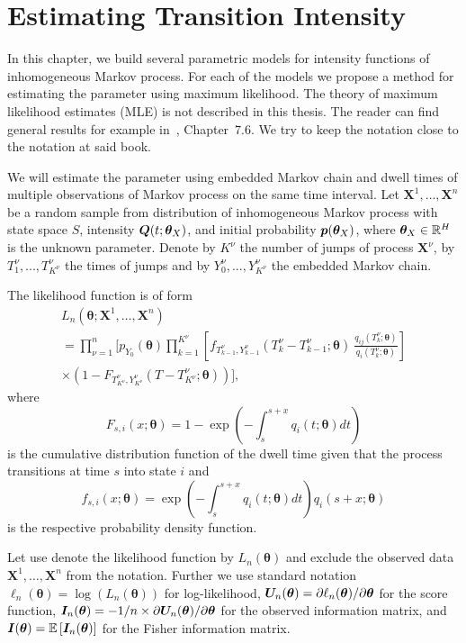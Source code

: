 \chapter{Estimating Transition Intensity}
	\label{chap:statistics}

In this chapter, we build several parametric models for intensity functions of inhomogeneous Markov process. For each of the models we propose a method for estimating the parameter using maximum likelihood. The theory of maximum likelihood estimates (MLE) is not described in this thesis. The reader can find general results for example in~\cite{Andel11}, Chapter~7.6. We try to keep the notation close to the notation at said book.

We will estimate the parameter using embedded Markov chain and dwell times of multiple observations of Markov process on the same time interval. Let $\mathbf{X}^1, \dots, \mathbf{X}^n$ be a random sample from distribution of inhomogeneous Markov process with state space $S$, intensity $\bm{Q} (t; \bm{\theta}_X)$, and initial probability $\bm{p} (\bm{\theta}_X)$, where $\bm{\theta}_X \in \mathbb{R}^H$ is the unknown parameter. Denote by $K^{\nu}$ the number of jumps of process $\mathbf{X}^{\nu}$, by $T^{\nu}_1, ... , T^{\nu}_{K^{\nu}}$ the times of jumps and by $Y^{\nu}_0, ... , Y^{\nu}_{K^{\nu}}$ the embedded Markov chain.

The likelihood function is of form
\begin{multline}
	L_n (\bm{\theta}; \mathbf{X}^1, \dots, \mathbf{X}^n) \\
	=
	\prod_{\nu=1}^n \Biggl[ p_{Y_0} (\mathbf{ \bm{\theta} })
	\prod_{k=1}^{K^{\nu}} \left[ f_{T_{k-1}^{\nu}, Y_{k-1}^{\nu}} (T_k^{\nu} - T_{k-1}^{\nu}; \mathbf{ \bm{\theta} }) \: \frac{q_{ij} (T_k^{\nu}; \mathbf{ \bm{\theta} })}{q_{i} (T_k^{\nu}; \mathbf{ \bm{\theta} })} \right]
	\\ 
	\times \left( 1-F_{T_{K^{\nu}}^{\nu},Y_{K^{\nu}}^{\nu}} (T-T_{K^{\nu}}^{\nu}; \mathbf{ \bm{\theta} }) \right) \Biggr],
	\label{eq:generalLik}
\end{multline}
where
\[
	F_{s,i} (x; \bm{\theta}) = 1 - \exp \left(- \int_{s}^{s+x} q_i(t; \bm{\theta}) dt \right)
\]
is the cumulative distribution function of the dwell time given that the process transitions at time $s$ into state $i$ and
\[
	f_{s,i} (x; \bm{\theta}) = \exp \left(- \int_{s}^{s+x} q_i(t; \bm{\theta}) dt \right) q_i(s+x; \bm{\theta})
\]
is the respective probability density function.

Let use denote the likelihood function by $L_n (\bm{\theta})$ and exclude the observed data $\mathbf{X}^1, \dots, \mathbf{X}^n$ from the notation. Further we use standard notation $\ell_n (\bm{\theta}) = \log(L_n (\bm{\theta}))$ for log-likelihood, $\bm{U}_n (\bm{\theta}) = \partial \ell_n (\bm{\theta}) / \partial \bm{\theta}$ for the score function, $\bm{I}_n (\bm{\theta}) = -1/n \times \partial \bm{U}_n (\bm{\theta}) / \partial \bm{\theta}$ for the observed information matrix, and $\bm{I} (\bm{\theta}) = \operatorname{\mathbb{E}\,} [\bm{I}_n (\bm{\theta})]$ for the Fisher information matrix.

